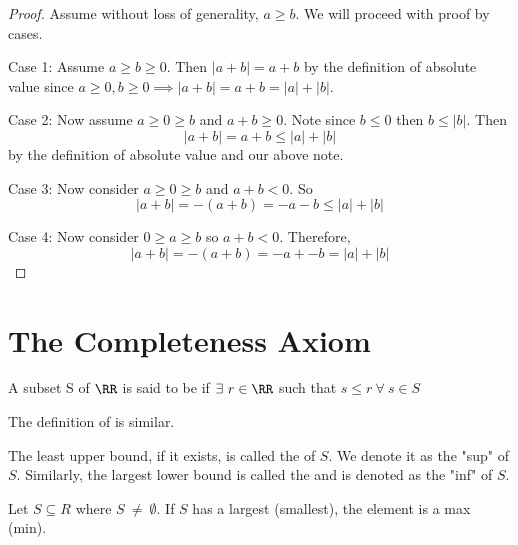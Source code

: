 \documentclass[12pt]{scrartcl}
\begin{document}
\begin{proof}
  Assume without loss of generality, $a \geq b$. We will proceed with proof by cases.

  Case 1: Assume $a \geq b \geq 0$. Then $|a + b| = a + b$ by the definition of absolute value since 
  $a \geq 0, b \geq 0 \implies |a + b| = a + b = |a| + |b|$.

  Case 2: Now assume $a \geq 0 \geq b$ and $a + b \geq 0$. Note since $b \leq 0$ then 
  $b \leq |b|$. Then 
  \[|a + b| = a + b \leq |a| + |b|\]
  by the definition of absolute value and our above note.

  Case 3: Now consider $a \geq 0 \geq b$ and $a + b < 0$. So 
  \[|a + b| = -(a + b) = -a - b \leq |a| + |b|\]

  Case 4: Now consider $0 \geq a \geq b$ so $a + b < 0$.
  Therefore, 
  \[|a + b| = -(a + b) = -a + - b = |a| + |b|\]

\end{proof}

\section{The Completeness Axiom}

\begin{definition}
  A subset S of $\RR$ is said to be  if $\exists \ r\in\RR$ such that
  $s \leq r \ \forall \ s \in S$

  The definition of  is similar.
\end{definition}

\begin{definition}
  The least upper bound, if it exists, is called the  of $S$. 
  We denote it as the "sup" of $S$. Similarly, the largest lower bound is called
  the  and is denoted as the "inf" of $S$.
\end{definition}

\begin{definition}
  Let $S \subseteq R$ where $S\ \neq \ \emptyset$. If $S$ has a largest (smallest), 
  the element is a max (min).
\end{definition}
\end{document}
